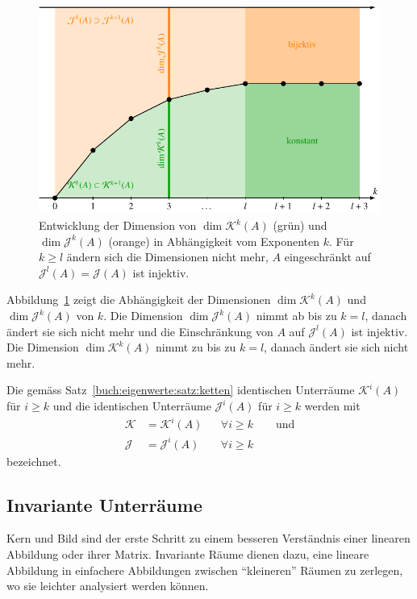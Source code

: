 \begin{figure}
\centering
\includegraphics{chapters/40-eigenwerte/images/dimjk.pdf}
\caption{Entwicklung der Dimension von $\dim\mathcal{K}^k(A)$ (grün)
und $\dim\mathcal{J}^k(A)$ (orange) in Abhängigkeit vom Exponenten $k$.
Für $k\ge l$ ändern sich die Dimensionen nicht mehr, $A$ eingeschränkt
auf $\mathcal{J}^l(A)=\mathcal{J}(A)$ ist injektiv.
\label{buch:eigenwerte:fig:dimjk}}
\end{figure}

Abbildung~\ref{buch:eigenwerte:fig:dimjk} zeigt die Abhängigkeit der
Dimensionen $\dim\mathcal{K}^k(A)$ und $\dim\mathcal{J}^k(A)$ von $k$.
Die Dimension $\dim\mathcal{J}^k(A)$ nimmt ab bis zu $k=l$, danach ändert
sie sich nicht mehr und die Einschränkung von $A$ auf $\mathcal{J}^l(A)$ 
ist injektiv.
Die Dimension $\dim\mathcal{K}^k(A)$ nimmt zu bis zu $k=l$, danach
ändert sie sich nicht mehr.

\begin{definition}
\label{buch:eigenwerte:def:KundJ}
Die gemäss Satz~\ref{buch:eigenwerte:satz:ketten} identischen Unterräume
$\mathcal{K}^i(A)$ für $i\ge k$ und die identischen Unterräume
$\mathcal{J}^i(A)$ für $i\ge k$ werden mit
\[
\begin{aligned}
\mathcal{K} &= \mathcal{K}^i(A)&&\forall i\ge k \qquad\text{und}
\\
\mathcal{J} &= \mathcal{J}^i(A)&&\forall i\ge k
\end{aligned}
\]
bezeichnet.
\end{definition}


%
%
\subsection{Invariante Unterräume
\label{buch:subsection:invariante-unterraeume}}
Kern und Bild sind der erste Schritt zu einem besseren Verständnis 
einer linearen Abbildung oder ihrer Matrix.
Invariante Räume dienen dazu, eine lineare Abbildung in einfachere
Abbildungen zwischen ``kleineren'' Räumen zu zerlegen, wo sie leichter
analysiert werden können.

